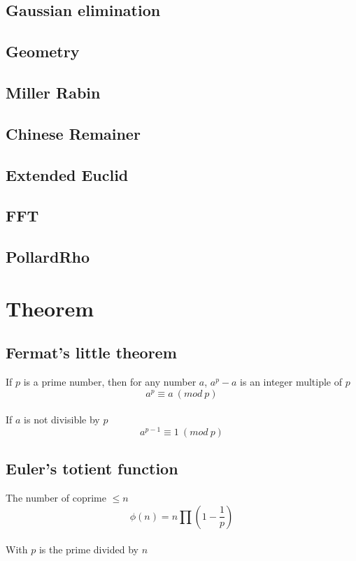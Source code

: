 \documentclass[A4 paper, 12pt, oneside]{article}
\begin{document}
\begin{landscape}
\begin{multicols}{2}
	\subsection{Gaussian elimination}
		    

	\subsection{Geometry}
	
	
	\subsection{Miller Rabin}
	

	\subsection{Chinese Remainer}
	
	
	\subsection{Extended Euclid}
	

	\subsection{FFT}
	

	\subsection{PollardRho}
	

\section{Theorem}
	\subsection{Fermat's little theorem}
	If $p$ is a prime number, then for any number $a$, \(a^p - a\) is an integer multiple of $p$ \\
	\[a ^ p \equiv a \ (mod \ p)\]  \\
	If $a$ is not divisible by $p$ \\
	\[a ^ {p - 1} \equiv 1 \ (mod \ p)\] 
	
	\subsection{Euler's totient function}
	The number of coprime $\leq n$ \\
	\[\phi(n) = n \prod (1 - \frac{1}{p}) \] \\
	With $p$ is the prime divided by $n$
	

\end{multicols}
\end{landscape}
\end{document}
